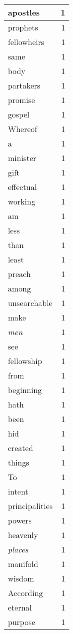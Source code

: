 \begin{center}
\begin{longtable}{l|r}
apostles & 1\\ \hline 
prophets & 1\\ \hline 
fellowheirs & 1\\ \hline 
same & 1\\ \hline 
body & 1\\ \hline 
partakers & 1\\ \hline 
promise & 1\\ \hline 
gospel & 1\\ \hline 
Whereof & 1\\ \hline 
a & 1\\ \hline 
minister & 1\\ \hline 
gift & 1\\ \hline 
effectual & 1\\ \hline 
working & 1\\ \hline 
am & 1\\ \hline 
less & 1\\ \hline 
than & 1\\ \hline 
least & 1\\ \hline 
preach & 1\\ \hline 
among & 1\\ \hline 
unsearchable & 1\\ \hline 
make & 1\\ \hline 
\emph{men} & 1\\ \hline 
see & 1\\ \hline 
fellowship & 1\\ \hline 
from & 1\\ \hline 
beginning & 1\\ \hline 
hath & 1\\ \hline 
been & 1\\ \hline 
hid & 1\\ \hline 
created & 1\\ \hline 
things & 1\\ \hline 
To & 1\\ \hline 
intent & 1\\ \hline 
principalities & 1\\ \hline 
powers & 1\\ \hline 
heavenly & 1\\ \hline 
\emph{places} & 1\\ \hline 
manifold & 1\\ \hline 
wisdom & 1\\ \hline 
According & 1\\ \hline 
eternal & 1\\ \hline 
purpose & 1\\ \hline 

\end{longtable}
\end{center}
